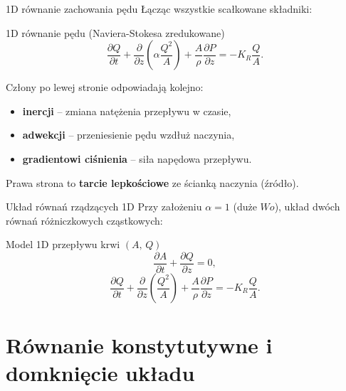 \documentclass[aspectratio=169]{beamer}
\begin{document}
\begin{frame}{1D równanie zachowania pędu}
  Łącząc wszystkie scałkowane składniki:
  \begin{block}{1D równanie pędu (Naviera-Stokesa zredukowane)}
    \[
      \frac{\partial Q}{\partial t}
      + \frac{\partial}{\partial z}\!\left(\alpha\frac{Q^2}{A}\right)
      + \frac{A}{\rho}\frac{\partial P}{\partial z}
      = -K_R\frac{Q}{A}.
    \]
  \end{block}
  \vspace{0.5em}
  Człony po lewej stronie odpowiadają kolejno:
  \begin{itemize}
    \item \textbf{inercji} – zmiana natężenia przepływu w czasie,
    \item \textbf{adwekcji} – przeniesienie pędu wzdłuż naczynia,
    \item \textbf{gradientowi ciśnienia} – siła napędowa przepływu.
  \end{itemize}
  Prawa strona to \textbf{tarcie lepkościowe} ze ścianką naczynia (źródło).
\end{frame}

\begin{frame}{Układ równań rządzących 1D}
  Przy założeniu $\alpha = 1$ (duże $Wo$), układ dwóch równań różniczkowych cząstkowych:
  \begin{block}{Model 1D przepływu krwi $(A,\,Q)$}
    \[
      \frac{\partial A}{\partial t} + \frac{\partial Q}{\partial z} = 0,
    \]
    \[
      \frac{\partial Q}{\partial t}
      + \frac{\partial}{\partial z}\!\left(\frac{Q^2}{A}\right)
      + \frac{A}{\rho}\frac{\partial P}{\partial z}
      = -K_R\frac{Q}{A}.
    \]
  \end{block}
\end{frame}

\section{Równanie konstytutywne i domknięcie układu}
\end{document}
